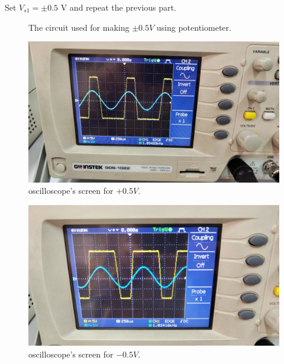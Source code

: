 \documentclass[11pt]{article}
\newcommand{\PicScale}{0.2}
\begin{document}
\begin{question}
\begin{subquestion}{Set $V_{s1}=\pm 0.5$ V and repeat the previous part.}
{\begin{figure}[H]
                \caption{The circuit used for making $\pm 0.5V$ using potentiometer.}
            \end{figure}
            \begin{figure}[H]
                \centering
                \includegraphics[scale=\PicScale,angle=0]{Fig/7.jpeg}
                \caption{oscilloscope's screen for $+0.5V$.}
            \end{figure}
            \begin{figure}[H]
                \centering
                \includegraphics[scale=\PicScale,angle=0]{Fig/9.jpeg}
                \caption{oscilloscope's screen for $-0.5V$.}
            \end{figure}
            }
        \end{subquestion}


\end{question}
\end{document}
